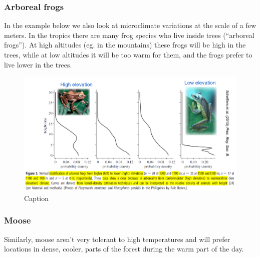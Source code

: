 \documentclass[12pt,oneside]{book}
\begin{document}
\subsubsection{Arboreal frogs}\label{arboreal-frogs}

In the example below we also look at microclimate variations at the
scale of a few meters. In the tropics there are many frog species who
live inside trees (``arboreal frogs''). At high altitudes (eg. in the
mountains) these frogs will be high in the trees, while at low altitudes
it will be too warm for them, and the frogs prefer to live lower in the
trees.

\begin{figure}

{\centering \includegraphics[width=1\linewidth]{figures/Figure1036} 

}

\caption{Caption}\label{fig:Micro36}
\end{figure}

\subsubsection{Moose}\label{moose}

Similarly, moose aren't very tolerant to high temperatures and will
prefer locations in dense, cooler, parts of the forest during the warm
part of the day.
\end{document}
